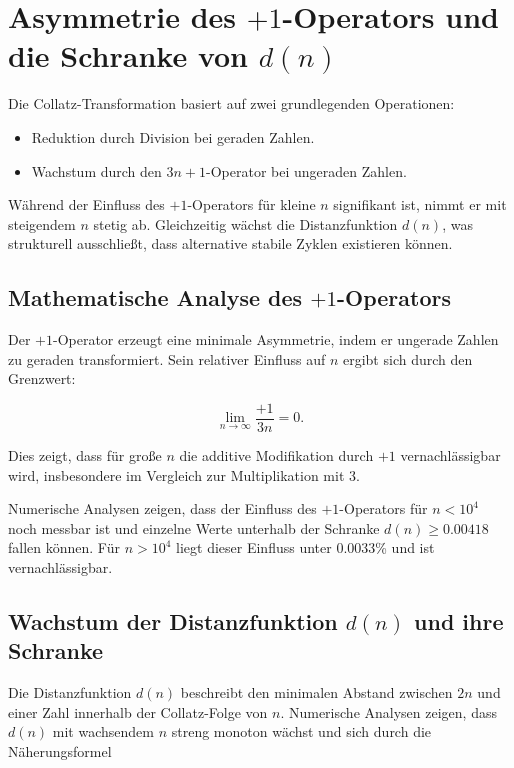 \documentclass[a4paper,12pt]{article}
\begin{document}
\section{Asymmetrie des \( +1 \)-Operators und die Schranke von \( d(n) \)}

Die Collatz-Transformation basiert auf zwei grundlegenden Operationen:

\begin{itemize}
    \item Reduktion durch Division bei geraden Zahlen.
    \item Wachstum durch den \( 3n+1 \)-Operator bei ungeraden Zahlen.
\end{itemize}

Während der Einfluss des \( +1 \)-Operators für kleine \( n \) signifikant ist, nimmt er mit steigendem \( n \) stetig ab. Gleichzeitig wächst die Distanzfunktion \( d(n) \), was strukturell ausschließt, dass alternative stabile Zyklen existieren können.

\subsection{Mathematische Analyse des \( +1 \)-Operators}

Der \( +1 \)-Operator erzeugt eine minimale Asymmetrie, indem er ungerade Zahlen zu geraden transformiert. Sein relativer Einfluss auf \( n \) ergibt sich durch den Grenzwert:

\begin{equation} 
    \lim_{n \to \infty} \frac{+1}{3n} = 0.
\end{equation}

Dies zeigt, dass für große \( n \) die additive Modifikation durch \( +1 \) vernachlässigbar wird, insbesondere im Vergleich zur Multiplikation mit 3.

Numerische Analysen zeigen, dass der Einfluss des \( +1 \)-Operators für \( n < 10^4 \) noch messbar ist und einzelne Werte unterhalb der Schranke \( d(n) \geq 0.00418 \) fallen können. Für \( n > 10^4 \) liegt dieser Einfluss unter 0.0033\% und ist vernachlässigbar.

\subsection{Wachstum der Distanzfunktion \( d(n) \) und ihre Schranke}

Die Distanzfunktion \( d(n) \) beschreibt den minimalen Abstand zwischen \( 2n \) und einer Zahl innerhalb der Collatz-Folge von \( n \). Numerische Analysen zeigen, dass \( d(n) \) mit wachsendem \( n \) streng monoton wächst und sich durch die Näherungsformel
\end{document}
